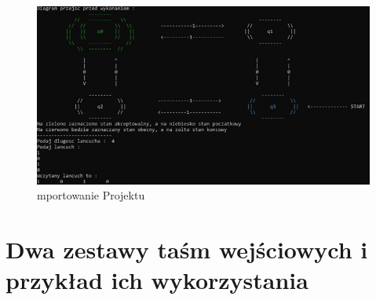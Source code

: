 \documentclass[10pt, a4paper]{report}
\begin{document}
    \begin{figure}[h]
        \begin{center}
            \includegraphics[scale=0.8]{photo4.jpg}
            \caption{mportowanie Projektu}
        \end{center}
    \end{figure}
    \newpage

    \section{Dwa zestawy taśm wejściowych i przykład ich wykorzystania}
\end{document}
